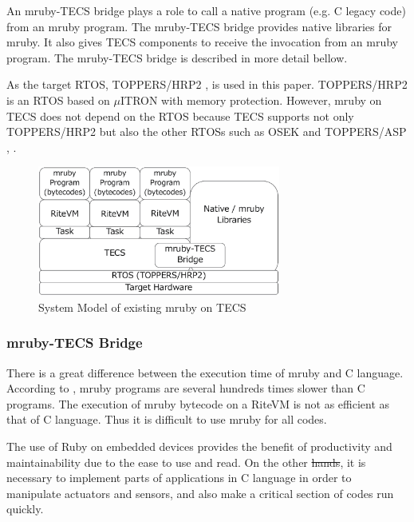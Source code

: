 \documentclass{sig-alternate-05-2015}
\providecommand{\DIFadd}[1]{{\protect\color{blue}\uwave{#1}}} %
\providecommand{\DIFdel}[1]{{\protect\color{red}\sout{#1}}}                      %
\providecommand{\DIFaddbegin}{} %
\providecommand{\DIFaddend}{} %
\providecommand{\DIFdelbegin}{} %
\providecommand{\DIFdelend}{} %
\begin{document}
An mruby-TECS bridge plays a role to call a native program (e.g. C legacy code) from an mruby program.
The mruby-TECS bridge provides native libraries for mruby.
It also gives TECS components to receive the invocation from an mruby program.
The mruby-TECS bridge is described in more detail bellow.

As the target RTOS, TOPPERS/HRP2 \cite{url:HRP2}, \cite{par:hr-tecs} is used in this paper.
TOPPERS/HRP2 is an RTOS based on $\mu$ITRON \cite{par:microITRON} with memory protection.
However, mruby on TECS does not depend on the RTOS because TECS supports not only TOPPERS/HRP2 but also the other RTOSs such as OSEK \cite{par:OSEK} and TOPPERS/ASP \cite{par:ASP}, \cite{url:ASP}.

\begin{figure}[t]
    \centering
    \includegraphics[width=8cm,clip]{figure/mrubyontecs.eps}
    \vspace{1mm}
\caption{System Model of existing mruby on TECS}
    \vspace{1mm}
\label{fig:mrubyontecs}
\end{figure}

\subsubsection{mruby-TECS Bridge}
There is a great difference between the execution time of mruby and C language.
According to  \cite{par:mrubyonTECS}, mruby programs are several hundreds times slower than C programs.
The execution of mruby bytecode on a RiteVM is not as efficient as that of C language.
Thus it is difficult to use mruby for all codes.

The use of Ruby on embedded devices provides the benefit of productivity and maintainability due to the ease to use and read.
On the other \DIFdelbegin \DIFdel{hands}\DIFdelend \DIFaddbegin \DIFadd{hand}\DIFaddend , it is necessary to implement parts of applications in C language in order to manipulate actuators and sensors, and also make a critical section of codes run quickly.
\end{document}
